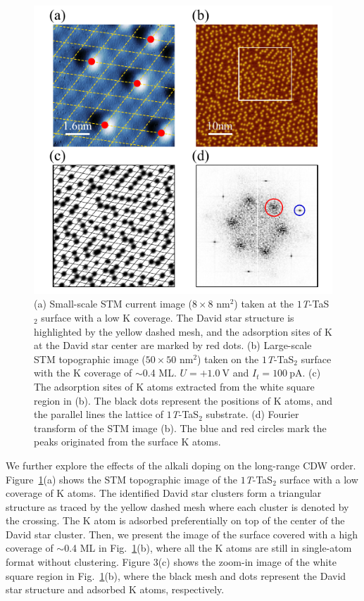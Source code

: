 \documentclass[aps,prl,reprint,groupedaddress,showpacs,amsfonts,amsmath,amssymb,superscriptaddress]{revtex4-1}
\begin{document}
\begin{figure}
  \centering
  \includegraphics[scale=1.0]{fig/fig3.pdf}
  \caption{\label{cdw-coherence}(a) Small-scale STM current image ($8 \times8$ $\mathrm{nm}^{2}$) taken at the $1$\emph{T}-TaS$_{2}$ surface with a low K coverage. The David star structure is highlighted by the yellow dashed mesh, and the adsorption sites of K at the David star center are marked by red dots. (b) Large-scale STM topographic image ($50 \times50$ $\mathrm{nm}^{2}$) taken on the $1$\emph{T}-TaS$_{2}$ surface with the K coverage of $\sim$0.4 ML. $U=+1.0~\mathrm{V}$ and $I_{t}=100~\mathrm{pA}$. (c) The adsorption sites of K atoms extracted from the white square region in (b). The black dots represent the positions of K atoms, and the parallel lines the lattice of $1$\emph{T}-TaS$_{2}$ substrate. (d) Fourier transform of the STM image (b). The blue and red circles mark the peaks originated from the surface K atoms.}
\end{figure}
We further explore the effects of the alkali doping on the long-range CDW order.
Figure~\ref{cdw-coherence}(a) shows the STM topographic image of the $1$\emph{T}-TaS$_{2}$ surface with a low coverage of K atoms. The identified David star clusters form a triangular structure as traced by the yellow dashed mesh where each cluster is denoted by the crossing. The K atom is adsorbed preferentially on top of the center of the David star cluster. Then, we present the image of the surface covered with a high coverage of $\sim$0.4 ML in Fig.~\ref{cdw-coherence}(b), where all the K atoms are still in single-atom format without clustering. Figure 3(c) shows the zoom-in image of the white square region in Fig.~\ref{cdw-coherence}(b), where the black mesh and dots represent the David star structure and adsorbed K atoms, respectively.
\end{document}
